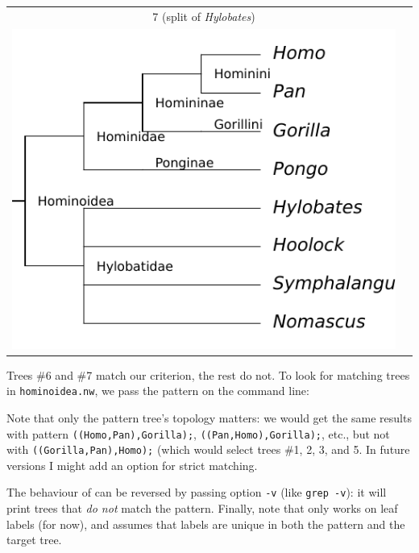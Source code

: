 \begin{samepage}
\begin{tabular}{cc}
7 (split of \emph{Hylobates}) \\
\includegraphics[scale=0.7]{homino_6.pdf} & 
\end{tabular}
\end{samepage}

\noindent{}Trees \#6 and \#7 match our criterion, the rest do not. To look for matching trees in \texttt{hominoidea.nw}, we pass the pattern on the command line:


\begin{samepage}

\end{samepage}

\noindent{}Note that only the pattern tree's topology matters: we would get the
same results with pattern \texttt{((Homo,Pan),Gorilla);},
\texttt{((Pan,Homo),Gorilla);}, etc., but not with
\texttt{((Gorilla,Pan),Homo);} (which would select trees \#1, 2, 3, and 5. In
future versions I might add an option for strict matching.

The behaviour of \match{} can be reversed by passing option \texttt{-v} (like
\texttt{grep -v}): it will print trees that \emph{do not} match the pattern.
Finally, note that \match{} only works on leaf labels (for now), and assumes
that labels are unique in both the pattern and the target tree.
